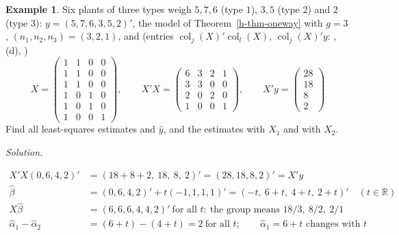 \documentclass[12pt]{article}
\newcommand{\R}{\mathbb R}
\DeclareMathOperator{\col}{col}
\DeclareMathOperator{\rank}{rank}
\DeclareMathOperator{\Span}{span}
\theoremstyle{definition}
\newtheorem{example}[theorem]{Example}
\newcommand{\boardtop}{\vspace*{-\abovedisplayskip}}
\begin{document}
\begin{example}\label{h-exm-oneway}
Six plants of three types weigh \(5,7,6\) (type \(1\)), \(3,5\) (type \(2\)) and \(2\) (type \(3\)): \(y=(5,7,6,3,5,2)'\),
the model of Theorem~\ref{h-thm-oneway} with \(g=3\), \((n_1,n_2,n_3)=(3,2,1)\), and (entries
\(\col_j(X)'\col_l(X)\), \(\col_j(X)'y\): , (d), )
\[
X=\begin{pmatrix}1&1&0&0\\1&1&0&0\\1&1&0&0\\1&0&1&0\\1&0&1&0\\1&0&0&1\end{pmatrix},\qquad
X'X=\begin{pmatrix}6&3&2&1\\3&3&0&0\\2&0&2&0\\1&0&0&1\end{pmatrix},\qquad
X'y=\begin{pmatrix}28\\18\\8\\2\end{pmatrix}
\]
Find all least-squares estimates and \(\hat y\), and the estimates with \(X_1\) and with \(X_2\).
\end{example}
\textit{Solution.}
\begin{board}[\(\rank X=3\), \(\mathcal N(X)=\Span\{(-1,1,1,1)'\}\) (Theorem~\ref{h-thm-oneway}(b)): \(X'X\) is singular
(Theorem~\ref{h-thm-normal}(b)); all solutions, that is, all least-squares estimates, by Theorems~\ref{h-thm-normal}(c)
and~\ref{h-thm-ls}(a):]
\boardtop
\begin{align*}
X'X(0,6,4,2)'&=(18+8+2,\ 18,\ 8,\ 2)'=(28,18,8,2)'=X'y\\
\hat\beta&=(0,6,4,2)'+t(-1,1,1,1)'=(-t,\ 6+t,\ 4+t,\ 2+t)'\quad(t\in\R)\\
X\hat\beta&=(6,6,6,4,4,2)'\ \text{for all }t:\ \text{the group means }18/3,\ 8/2,\ 2/1\\
\hat\alpha_1-\hat\alpha_2&=(6+t)-(4+t)=2\ \text{for all }t;\qquad\hat\alpha_1=6+t\text{ changes with }t
\end{align*}
\end{board}
\end{document}
